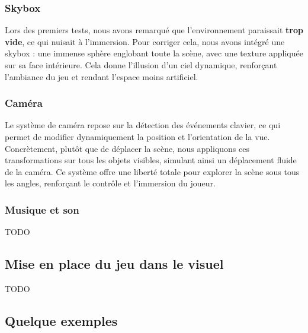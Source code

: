 \subsubsection{Skybox}
Lors des premiers tests, nous avons remarqué que l’environnement paraissait \textbf{trop vide}, ce qui nuisait à l’immersion. Pour corriger cela, nous avons intégré une skybox : une immense sphère englobant toute la scène, avec une texture appliquée sur sa face intérieure. Cela donne l’illusion d’un ciel dynamique, renforçant l’ambiance du jeu et rendant l’espace moins artificiel.
\subsubsection{Caméra}
Le système de caméra repose sur la détection des événements clavier, ce qui permet de modifier dynamiquement la position et l’orientation de la vue. Concrètement, plutôt que de déplacer la scène, nous appliquons ces transformations sur tous les objets visibles, simulant ainsi un déplacement fluide de la caméra. Ce système offre une liberté totale pour explorer la scène sous tous les angles, renforçant le contrôle et l’immersion du joueur.
\subsubsection{Musique et son}
TODO

\subsection{Mise en place du jeu dans le visuel}
TODO

\subsection{Quelque exemples}